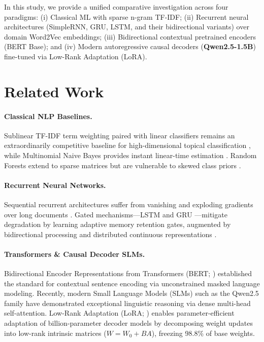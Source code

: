 \documentclass[11pt,a4paper,twocolumn]{article}
\begin{document}
In this study, we provide a unified comparative investigation across four paradigms: (i) Classical ML with sparse n-gram TF-IDF; (ii) Recurrent neural architectures (SimpleRNN, GRU, LSTM, and their bidirectional variants) over domain Word2Vec embeddings; (iii) Bidirectional contextual pretrained encoders (BERT Base); and (iv) Modern autoregressive causal decoders (\textbf{Qwen2.5-1.5B}) fine-tuned via Low-Rank Adaptation (LoRA).

\section{Related Work}
\paragraph{Classical NLP Baselines.} Sublinear TF-IDF term weighting \cite{sparck1972statistical} paired with linear classifiers remains an extraordinarily competitive baseline for high-dimensional topical classification \cite{joachims1998text}, while Multinomial Naive Bayes provides instant linear-time estimation \cite{mccallum1998comparison}. Random Forests extend to sparse matrices but are vulnerable to skewed class priors \cite{breiman2001random}.

\paragraph{Recurrent Neural Networks.} Sequential recurrent architectures suffer from vanishing and exploding gradients over long documents \cite{elman1990finding}. Gated mechanisms—LSTM \cite{hochreiter1997long} and GRU \cite{cho2014learning}—mitigate degradation by learning adaptive memory retention gates, augmented by bidirectional processing \cite{schuster1997bidirectional} and distributed continuous representations \cite{mikolov2013efficient}.

\paragraph{Transformers \& Causal Decoder SLMs.} Bidirectional Encoder Representations from Transformers (BERT; \cite{devlin2019bert}) established the standard for contextual sentence encoding via unconstrained masked language modeling. Recently, modern Small Language Models (SLMs) such as the Qwen2.5 family \cite{yang2024qwen2} have demonstrated exceptional linguistic reasoning via dense multi-head self-attention. Low-Rank Adaptation (LoRA; \cite{hu2021lora}) enables parameter-efficient adaptation of billion-parameter decoder models by decomposing weight updates into low-rank intrinsic matrices ($W = W_0 + B A$), freezing 98.8\% of base weights.
\end{document}
